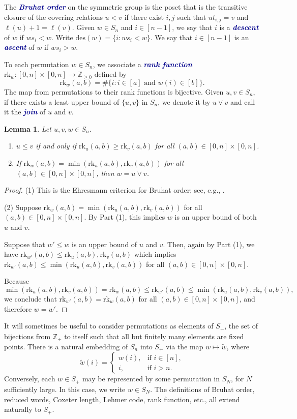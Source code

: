\documentclass[12 pt]{amsart}
\newcommand{\newword}[1]{\textcolor{darkblue}{\textbf{\emph{#1}}}}
\newcommand{\rk}{\mathrm{rk}}
\newcommand{\des}{\mathrm{des}}
\newtheorem{lemma}[Theorem]{Lemma}
\numberwithin{equation}{section}
\theoremstyle{remark}
\begin{document}
	
	The \newword{Bruhat order} on the symmetric group is the poset that is the transitive closure of the covering relations $u < v$ if there exist $i,j$ such that $ut_{i,j} = v$ and $\ell(u) + 1 = \ell(v)$.
	Given $w \in S_n$ and $i \in[n-1]$, we say that $i$ is a \newword{descent} of $w$ if $ws_i < w$. 
	Write $\des(w) = \{i : ws_i < w\}$. 
	We say that $i \in [n-1]$ is an \newword{ascent} of $w$ if $ws_i > w$.
	
	To each permutation $w \in S_n$, we associate a \newword{rank function} $\rk_w:[0,n] \times [0,n]\rightarrow \mathbb{Z}_{\geq 0}$ defined by \[\rk_w(a,b) = \#\{i: i \in [a] \text{ and } w(i) \in [b]\}.\] The map from permutations to their rank functions is bijective.
	Given $u,v \in S_n$, if there exists a least upper bound of $\{u,v\}$ in $S_n$, we denote it by $u \vee v$ and call it the \newword{join} of $u$ and $v$.
	
	\begin{lemma}
		\label{lemma:rankbruhat}
		Let $u,v,w \in S_n$.
		\begin{enumerate}
			\item $u\leq v$ if and only if $\rk_u(a,b)\geq \rk_v(a,b)$ for all $(a,b) \in [0,n] \times [0,n]$.
			\item If $\rk_w(a,b) = \min(\rk_u(a,b),\rk_v(a,b))$ for all $(a,b) \in [0,n] \times [0,n]$, then $w = u\vee v$.
		\end{enumerate}
	\end{lemma}
	\begin{proof}
		\noindent (1) This is the Ehresmann criterion for Bruhat order; see, e.g., \cite[Theorem 2.1.5]{Bjorner.Brenti}.
		
		\noindent (2) Suppose $\rk_w(a,b) = \min(\rk_u(a,b),\rk_v(a,b))$ for all $(a,b) \in [0,n] \times [0,n]$. By Part (1), this implies $w$ is an upper bound of both $u$ and $v$.
		
		Suppose that $w' \leq w$ is an upper bound of $u$ and $v$. Then, again by Part (1), we have
		$\rk_{w'}(a,b)\leq \rk_u(a,b),\rk_v(a,b)$ which implies $\rk_{w'}(a,b)\leq \min(\rk_u(a,b),\rk_v(a,b))$ for all $(a,b) \in [0,n] \times [0,n]$.
		
		Because
		\[\min(\rk_u(a,b),\rk_v(a,b)) = \rk_w(a,b)\leq \rk_{w'}(a,b)\leq \min(\rk_u(a,b),\rk_v(a,b)),\] we conclude that $\rk_{w'}(a,b) = \rk_w(a,b)$ for all $(a,b)\in [0,n] \times [0,n]$, and therefore $w = w'$.
	\end{proof}
	
	It will sometimes be useful to consider permutations as elements of $S_{+} $, the set of bijections from $\mathbb{Z}_{+}$ to itself such that all but finitely many elements are fixed points. 
	There is a natural embedding of $S_n$ into $S_{+}$ via the map $w\mapsto \tilde{w}$, where
	\[
	\tilde{w}(i) = 
	\begin{cases}
		w(i), & \text{if } i \in [n], \\
		i, & \text{if } i > n.
	\end{cases}
	\]
	Conversely, each $w \in S_{+} $ may be represented by some permutation in $S_N$, for $N$ sufficiently large. 
	In this case, we write $w \in S_N$. 
	The definitions of Bruhat order, reduced words, Coxeter length, Lehmer code, rank function, etc., all extend naturally to $S_{+} $.
	
\end{document}
